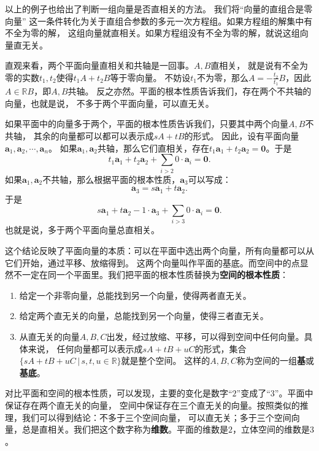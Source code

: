 \documentclass[12pt,UTF8,fontset=none]{ctexbook}
\begin{document}
以上的例子也给出了判断一组向量是否直相关的方法。
我们将“向量的直组合是零向量”
这一条件转化为关于直组合参数的多元一次方程组。如果方程组的解集中有不全为零的解，
这组向量就直相关。如果方程组没有不全为零的解，就说这组向量直无关。

直观来看，两个平面向量直相关和共轴是一回事。$A, B$直相关，
就是说有不全为零的实数$t_1,t_2$使得$t_1A + t_2B$等于零向量。
不妨设$t_1$不为零，那么$A = -\frac{t_2}{t_1}B$，因此$A\in\mathbb{R}B$，即$A, B$共轴。
反之亦然。平面的根本性质告诉我们，存在两个不共轴的向量，也就是说，
不多于两个平面向量，可以直无关。

如果平面中的向量多于两个，平面的根本性质告诉我们，只要其中两个向量$A, B$不共轴，
其余的向量都可以都可以表示成$sA + tB$的形式。
因此，设有平面向量$\mathbf{a}_1, \mathbf{a}_2, \cdots , \mathbf{a}_n$。
如果$\mathbf{a}_1, \mathbf{a}_2$共轴，那么它们直相关，存在$t_1\mathbf{a}_1 + t_2\mathbf{a}_2 = \mathbf{0}$。于是
$$t_1\mathbf{a}_1 + t_2\mathbf{a}_2 + \sum_{i>2}0\cdot\mathbf{a}_i = \mathbf{0}.$$
如果$\mathbf{a}_1, \mathbf{a}_2$不共轴，那么根据平面的根本性质，$\mathbf{a}_3$可以写成：
$$ \mathbf{a}_3 = s\mathbf{a}_1 + t\mathbf{a}_2.$$
于是
$$s\mathbf{a}_1 + t\mathbf{a}_2 - 1\cdot\mathbf{a}_3 + \sum_{i>3}0\cdot\mathbf{a}_i = \mathbf{0}.$$
也就是说，多于两个平面向量总直相关。

这个结论反映了平面向量的本质：可以在平面中选出两个向量，所有向量都可以从它们开始，通过平移、放缩得到。
这两个向量叫作平面的基底。而空间中的点显然不一定在同一个平面里。我们把平面的根本性质替换为\textbf{空间的根本性质}：

\begin{enumerate}
    \item 给定一个非零向量，总能找到另一个向量，使得两者直无关。
    \item 给定两个直无关的向量，总能找到另一个向量，使得三者直无关。
    \item 从直无关的向量$A, B, C$出发，经过放缩、平移，可以得到空间中任何向量。具体来说，
    任何向量都可以表示成$sA + tB + uC$的形式，集合$\{sA + tB + uC \, | \, s, t, u \in\mathbb{R}\}$就是整个空间。
    这样的$A, B, C$称为空间的一组\textbf{基}或\textbf{基底}。
\end{enumerate}

对比平面和空间的根本性质，可以发现，主要的变化是数字“$2$”变成了“$3$”。平面中保证存在两个直无关的向量，
空间中保证存在三个直无关的向量。按照类似的推理，我们可以得到结论：不多于三个空间向量，
可以直无关；多于三个空间向量，总是直相关。我们把这个数字称为\textbf{维数}。平面的维数是$2$，立体空间的维数是$3$。
\end{document}
